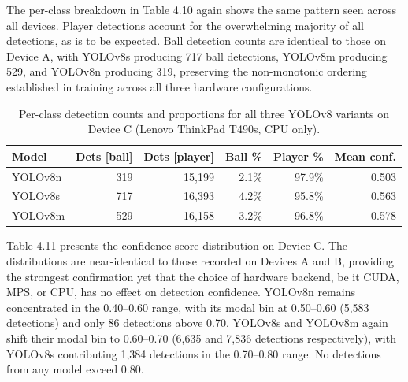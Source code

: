 \begin{table}[H]
\centering

\label{tab:inference_cpu_summary}
\caption{Inference summary statistics for all three YOLOv8 variants on Device C (Lenovo ThinkPad T490s, CPU only).}
\end{table}

The per-class breakdown in Table 4.10 again shows the same pattern seen across all devices. Player detections account for the overwhelming majority of all detections, as is to be expected. Ball detection counts are identical to those on Device A, with YOLOv8s producing 717 ball detections, YOLOv8m producing 529, and YOLOv8n producing 319, preserving the non-monotonic ordering established in training across all three hardware configurations.
\begin{table}[H]
\centering
\caption{Per-class detection counts and proportions for all three YOLOv8 variants on Device C (Lenovo ThinkPad T490s, CPU only).}
\label{tab:inference_cpu_class}
\begin{tabular}{lrrrrr}
\toprule
\textbf{Model} & \textbf{Dets [ball]} & \textbf{Dets [player]} & \textbf{Ball \%} & \textbf{Player \%} & \textbf{Mean conf.} \\
\midrule
YOLOv8n & 319 & 15{,}199 & 2.1\% & 97.9\% & 0.503 \\
YOLOv8s & 717 & 16{,}393 & 4.2\% & 95.8\% & 0.563 \\
YOLOv8m & 529 & 16{,}158 & 3.2\% & 96.8\% & 0.578 \\
\bottomrule
\end{tabular}
\end{table}
Table 4.11 presents the confidence score distribution on Device C. The distributions are near-identical to those recorded on Devices A and B, providing the strongest confirmation yet that the choice of hardware backend, be it CUDA, MPS, or CPU, has no effect on detection confidence. YOLOv8n remains concentrated in the 0.40--0.60 range, with its modal bin at 0.50--0.60 (5,583 detections) and only 86 detections above 0.70. YOLOv8s and YOLOv8m again shift their modal bin to 0.60--0.70 (6,635 and 7,836 detections respectively), with YOLOv8s contributing 1,384 detections in the 0.70--0.80 range. No detections from any model exceed 0.80.

